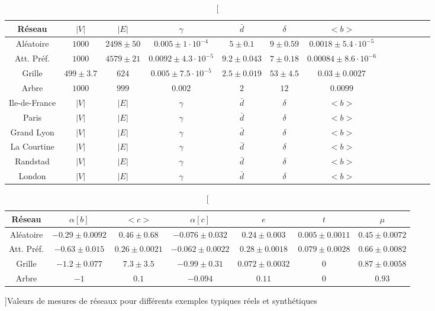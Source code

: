 \begin{table}
\hspace{-1cm}
\begin{tabular}{c|c|c|c|c|c|c|c|c|c|c|c|c}
\hline
Réseau & $\left|V\right|$ & $\left|E\right|$ & $\gamma$ & $\bar{d}$ & $\delta$ & $<b>$ \\\hline
Aléatoire & $1000$ & $2498 \pm 50 $ & $0.005 \pm 1\cdot 10^{-4} $ & $5 \pm 0.1 $ & $9 \pm 0.59 $ & $0.0018 \pm 5.4\cdot 10^{-5} $\\\hline
Att. Préf. & $1000$ & $4579 \pm 21 $ & $0.0092 \pm 4.3\cdot 10^{-5} $ & $9.2 \pm 0.043 $ & $7 \pm 0.18 $ & $0.00084 \pm 8.6\cdot 10^{-6} $\\\hline
Grille & $499\pm 3.7 $ & $624$ & $0.005 \pm 7.5\cdot 10^{-5} $ & $2.5 \pm 0.019 $ & $53 \pm 4.5 $ & $0.03 \pm 0.0027 $\\\hline
Arbre & $1000$ & $999$ & $0.002$ & $2$ & $12$ & $0.0099$\\\hline
Ile-de-France & $\left|V\right|$ & $\left|E\right|$ & $\gamma$ & $\bar{d}$ & $\delta$ & $<b>$\\\hline
Paris & $\left|V\right|$ & $\left|E\right|$ & $\gamma$ & $\bar{d}$ & $\delta$ & $<b>$\\\hline
Grand Lyon & $\left|V\right|$ & $\left|E\right|$ & $\gamma$ & $\bar{d}$ & $\delta$ & $<b>$\\\hline
La Courtine & $\left|V\right|$ & $\left|E\right|$ & $\gamma$ & $\bar{d}$ & $\delta$ & $<b>$\\\hline
Randstad & $\left|V\right|$ & $\left|E\right|$ & $\gamma$ & $\bar{d}$ & $\delta$ & $<b>$\\\hline
London& $\left|V\right|$ & $\left|E\right|$ & $\gamma$ & $\bar{d}$ & $\delta$ & $<b>$\\\hline
\end{tabular}
\bigskip
\hspace{-1cm}
\begin{tabular}{c|c|c|c|c|c|c}
\hline
Réseau & $\alpha \left[b\right]$ & $<c>$ & $\alpha\left[c\right]$ & $e$ & $t$ & $\mu$\\\hline
Aléatoire & $-0.29 \pm 0.0092 $ & $0.46 \pm 0.68 $ & $-0.076 \pm 0.032 $ & $0.24 \pm 0.003 $ & $0.005 \pm 0.0011 $ & $0.45 \pm 0.0072 $\\\hline
Att. Préf. & $-0.63 \pm 0.015 $ & $0.26 \pm 0.0021 $ & $-0.062 \pm 0.0022 $ & $0.28 \pm 0.0018 $ & $0.079 \pm 0.0028 $ & $0.66 \pm 0.0082 $\\\hline
Grille & $-1.2 \pm 0.077 $ & $7.3 \pm 3.5 $ & $-0.99 \pm 0.31 $ & $0.072 \pm 0.0032 $ & $0$ & $0.87 \pm 0.0058 $\\\hline
Arbre & $-1$ & $0.1$ & $-0.094$ & $0.11$ & $0$ & $0.93$
\end{tabular}

\caption[][]{}{Valeurs de mesures de réseaux pour différents exemples typiques réels et synthétiques \label{tab:measures}}
\end{table}



